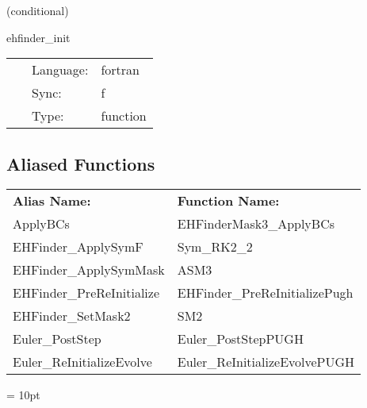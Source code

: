 \vspace{5mm}

   (conditional) 

\hspace{5mm} ehfinder\_init 

\hspace{5mm}{\it setup local variables } 


\hspace{5mm}

 \begin{tabular*}{160mm}{cll} 
~ & Language:  & fortran \\ 
~ & Sync:  & f \\ 
~ & Type:  & function \\ 
\end{tabular*} 


\subsection*{Aliased Functions}

\hspace{5mm}

 \begin{tabular*}{160mm}{ll} 

{\bf Alias Name:} ~~~~~~~ & {\bf Function Name:} \\ 
ApplyBCs & EHFinderMask3\_ApplyBCs \\ 
EHFinder\_ApplySymF & Sym\_RK2\_2 \\ 
EHFinder\_ApplySymMask & ASM3 \\ 
EHFinder\_PreReInitialize & EHFinder\_PreReInitializePugh \\ 
EHFinder\_SetMask2 & SM2 \\ 
Euler\_PostStep & Euler\_PostStepPUGH \\ 
Euler\_ReInitializeEvolve & Euler\_ReInitializeEvolvePUGH \\ 
\end{tabular*} 



\vspace{5mm}\parskip = 10pt 
